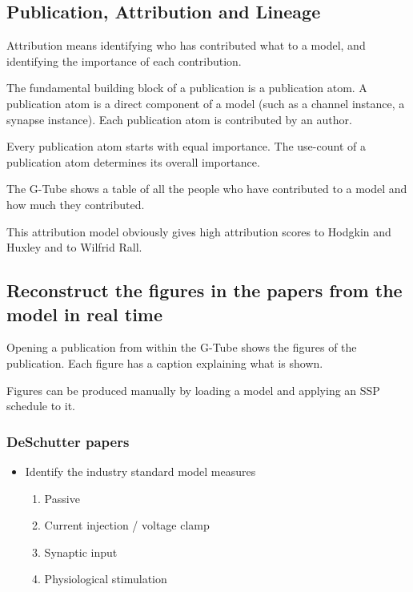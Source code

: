 \documentclass[12pt]{article}
\begin{document}
\subsection{Publication, Attribution and Lineage}

Attribution means identifying who has contributed what to a model, and
identifying the importance of each contribution.

The fundamental building block of a publication is a publication atom.
A publication atom is a direct component of a model (such as a channel
instance, a synapse instance).  Each publication atom is contributed
by an author.

Every publication atom starts with equal importance.  The use-count of
a publication atom determines its overall importance.

The G-Tube shows a table of all the people who have contributed to a
model and how much they contributed.

This attribution model obviously gives high attribution scores to
Hodgkin and Huxley and to Wilfrid Rall.




\subsection{Reconstruct the figures in the papers from the model in real time}

Opening a publication from within the G-Tube shows the figures of the
publication.  Each figure has a caption explaining what is shown.

Figures can be produced manually by loading a model and applying an
SSP schedule to it.



\subsubsection{DeSchutter papers}
\begin{itemize}
\item Identify the industry standard model measures
  \begin{enumerate}
  \item Passive
  \item Current injection / voltage clamp
  \item Synaptic input
  \item Physiological stimulation
  \end{enumerate}
\end{itemize}
\end{document}
